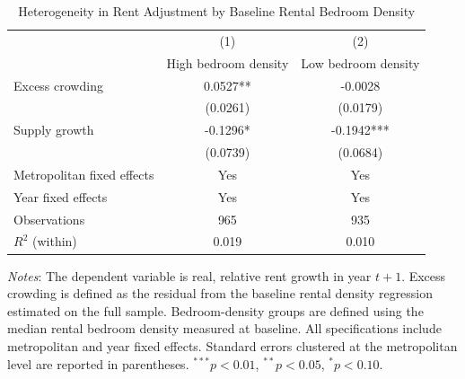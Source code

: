 \begin{table}[!htbp]
\centering
\caption{Heterogeneity in Rent Adjustment by Baseline Rental Bedroom Density}
\label{tab:density_heterogeneity}
\begin{tabular}{l cc}
\hline\hline
 & (1) & (2) \\
 & High bedroom density & Low bedroom density \\
\hline
Excess crowding          & 0.0527**      & -0.0028 \\
                         & (0.0261)      & (0.0179) \\
Supply growth            & -0.1296*      & -0.1942*** \\
                         & (0.0739)      & (0.0684) \\
\hline
Metropolitan fixed effects & Yes         & Yes \\
Year fixed effects         & Yes         & Yes \\
Observations               & 965         & 935 \\
$R^{2}$ (within)           & 0.019       & 0.010 \\
\hline\hline
\end{tabular}

\begin{flushleft}
\footnotesize
\textit{Notes}: The dependent variable is real, relative rent growth in year $t+1$.
Excess crowding is defined as the residual from the baseline rental density regression
estimated on the full sample. Bedroom-density groups are defined using the median
rental bedroom density measured at baseline. All specifications include metropolitan
and year fixed effects. Standard errors clustered at the metropolitan level are reported
in parentheses. $^{***}p<0.01$, $^{**}p<0.05$, $^{*}p<0.10$.
\end{flushleft}
\end{table}